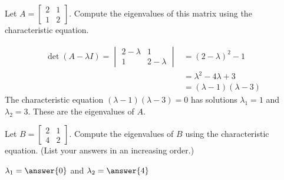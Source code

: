 \documentclass{ximera}
\begin{document}
\begin{example}\label{ex:2x2eig}
Let $A=\begin{bmatrix} 2& 1\\ 1&2
\end{bmatrix}$.  Compute the eigenvalues of this matrix using the characteristic equation.
\begin{explanation}
\begin{align*}\det(A-\lambda I)=\begin{vmatrix}2-\lambda&1\\1&2-\lambda\end{vmatrix}&=(2-\lambda)^2-1\\
&=\lambda^2-4\lambda+3\\
&=(\lambda-1)(\lambda-3)
\end{align*}
The characteristic equation $(\lambda-1)(\lambda-3)=0$ has solutions $\lambda_1=1$ and $\lambda_2=3$.  These are the eigenvalues of $A$.
\end{explanation}
\end{example}
    
\begin{example}\label{ex:2x2eig2}
Let $B=\begin{bmatrix} 2& 1\\ 4&2
\end{bmatrix}$.  Compute the eigenvalues of $B$ using the characteristic equation.  (List your answers in an increasing order.)
    
$\lambda_1=\answer{0}$ and $\lambda_2=\answer{4}$
\end{example}
\end{document}
